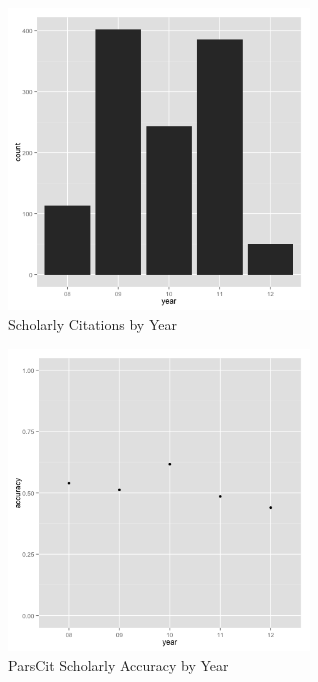 \documentclass[12pt]{article}
\begin{document}
\begin{figure}
\begin{center}
\includegraphics[height=8cm]{scholarly_totals.png}
\caption{Scholarly Citations by Year}
\label{fig:scholarlytotals}
\end{center}
\end{figure}

\begin{figure}
\begin{center}
\includegraphics[height=8cm]{scholarly_accuracy.png}
\caption{ParsCit Scholarly Accuracy by Year}
\label{fig:scholarlyaccuracy}
\end{center}
\end{figure}
\end{document}
